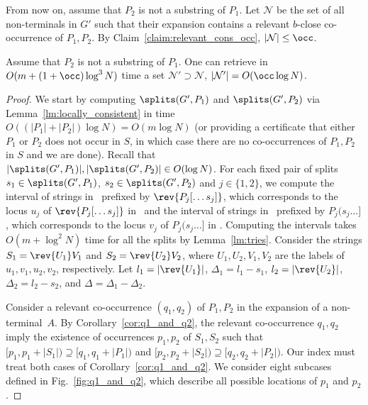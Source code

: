 From now on, assume that $P_2$ is not a substring of $P_1$. Let $\mathcal{N}$ be the set of all non-terminals in $G'$ such that their expansion contains a relevant $b$-close co-occurrence of $P_1, P_2$. By Claim~\ref{claim:relevant_cons_occ}, $|\mathcal{N}| \le \occ$. 

\begin{lemma}\label{lm:non-term_close_co_occ}
Assume that $P_2$ is not a substring of $P_1$. One can retrieve in $O(m+(1+\occ)\log^3 N)$ time a set $\mathcal{N}' \supset \mathcal{N}$, $|\mathcal{N}'| = O(\occ \log N)$. 
\end{lemma}
\begin{proof}
We start by computing $\splits(G',P_1)$ and $\splits(G',P_2)$ via Lemma~\ref{lm:locally_consistent} in time $O((|P_1|+|P_2|) \log N) = O(m \log N)$ (or providing a certificate that either $P_1$ or $P_2$ does not occur in $S$, in which case there are no co-occurrences of $P_1,P_2$ in $S$ and we are done). Recall that $|\splits(G',P_1)|, |\splits(G',P_2)| \in O(\log N)$. For each fixed pair of splits $s_1 \in \splits (G',P_1)$, $s_2 \in \splits (G',P_2)$ and $j \in \{1,2\}$, we compute the interval of strings in \Tpre\ prefixed by $\rev{P_j[\dots s_j]}$, which corresponds to the locus $u_j$ of $\rev{P_j[\dots s_j]}$ in \Tpre\, and the interval of strings in \Tsuf\ prefixed by $P_j(s_j \dots ]$, which corresponds to the locus $v_j$ of $P_j(s_j \dots ]$ in \Tsuf. Computing the intervals takes $O(m+\log^2 N)$ time for all the splits by Lemma~\ref{lm:tries}. Consider the strings $S_1=\rev{U_1}V_1$ and $S_2=\rev{U_2}V_2$, where $U_1, U_2, V_1, V_2$ are the labels of $u_1, v_1, u_2, v_2$, respectively. Let $l_1 = |\rev{U_1}|$, $\Delta_1 = l_1-s_1$, $l_2 = |\rev{U_2}|$, $\Delta_2 = l_2-s_2$, and $\Delta = \Delta_1-\Delta_2$. 

\sloppy Consider a relevant co-occurrence $(q_1,q_2)$ of $P_1,P_2$ in the expansion of a non-terminal~$A$. 
By Corollary~\ref{cor:q1_and_q2}, the relevant co-occurrence $q_1,q_2$ imply the existence of occurrences $p_1,p_2$ of $S_1,S_2$ such that $[p_1,p_1+|S_1|) \supseteq [q_1,q_1+|P_1|)$ and $[p_2,p_2+|S_2|) \supseteq [q_2,q_2+|P_2|)$. 
Our index must treat both cases of Corollary~\ref{cor:q1_and_q2}. We consider eight subcases defined in Fig.~\ref{fig:q1_and_q2}, which describe all possible locations of $p_1$ and $p_2$. 




\end{proof}
